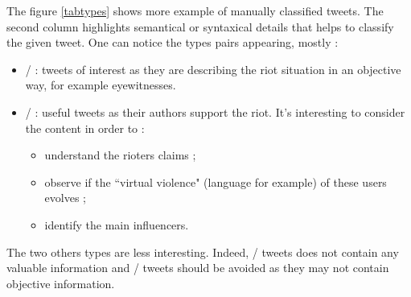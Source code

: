 \documentclass[a4paper,twoside,12pt,openright]{report}
\begin{document}
The figure \ref{tabtypes} shows more example of manually classified tweets. The second column highlights semantical or syntaxical details that helps to classify the given tweet.
One can notice the types pairs appearing, mostly :

\begin{itemize}
\item {}/ : tweets of interest as they are describing the riot situation in an objective way, for example eyewitnesses.
\item {}/ : useful tweets as their authors support the riot. It's interesting to consider the content in order to :
\begin{itemize}
\item understand the rioters claims ;
\item observe if the ``virtual violence" (language for example) of these users evolves ;
\item identify the main influencers.
\end{itemize}
\end{itemize}

The two others types are less interesting. Indeed, / tweets does not contain any valuable information and / tweets should be avoided as they may not contain objective information.
\end{document}
